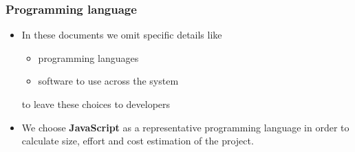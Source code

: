 
\begin{frame}
	\frametitle{Programming language}
	\begin{itemize}	
		\item In these documents we omit specific details like
			\begin{itemize}
				\item programming languages
				\item software to use across the system
			\end{itemize}
			to leave these choices to developers
		\pause
		\item We choose \textbf{JavaScript} as a representative programming language in order to calculate size, effort and cost estimation of the project. 
	\end{itemize}
\end{frame}

